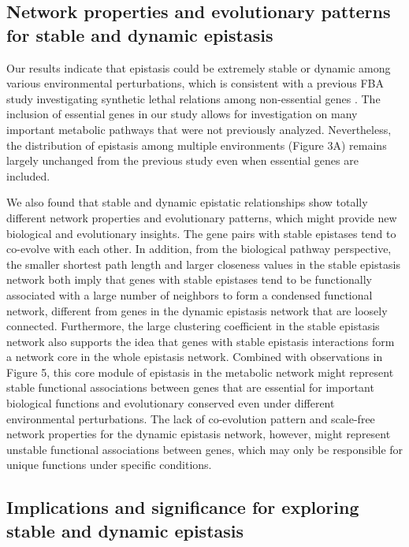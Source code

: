 \subsection{Network properties and evolutionary patterns for stable
and dynamic epistasis}

Our results indicate that epistasis could be extremely stable or
dynamic among various environmental perturbations, which is consistent
with a previous FBA study investigating synthetic lethal relations
among non-essential genes \citep{Harrison2007}. The inclusion of
essential genes in our study allows for investigation on many
important metabolic
pathways that were not previously analyzed. Nevertheless, the
distribution of epistasis among multiple environments (Figure 3A)
remains largely unchanged from the previous study \citep{Harrison2007}
even when essential genes are included.

We also found that stable and dynamic epistatic relationships show
totally different network properties and evolutionary patterns, which
might provide new biological and evolutionary insights. The gene pairs
with stable epistases tend to co-evolve with each other. In addition,
from the biological pathway perspective, the smaller shortest path
length and larger closeness values in the stable epistasis network
both imply that genes with stable epistases tend to be functionally
associated with a large number of neighbors to form a condensed
functional network, different from genes in the dynamic epistasis
network that are loosely connected. Furthermore, the large clustering
coefficient in the stable epistasis network also supports the idea
that genes with stable epistasis interactions form a network core in
the whole epistasis network. Combined with observations in Figure 5,
this core module of epistasis in the metabolic network might represent
stable functional associations between genes that are essential for
important biological functions and evolutionary conserved even under
different environmental perturbations. The lack of co-evolution
pattern and scale-free network properties for the dynamic epistasis
network, however, might represent unstable functional associations
between genes, which may only be responsible for unique functions
under specific conditions.

\subsection{Implications and significance for exploring stable and
dynamic epistasis}

